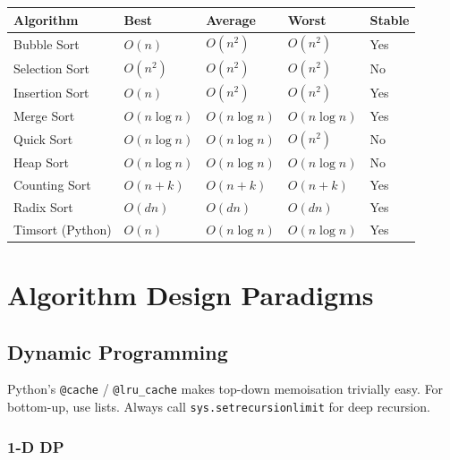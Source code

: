\documentclass[11pt,a4paper]{report}
\begin{document}
\begin{compbox}
\begin{tabular}{@{}lllll@{}}
\toprule
\textbf{Algorithm} & \textbf{Best} & \textbf{Average} & \textbf{Worst} & \textbf{Stable} \\
\midrule
Bubble Sort    & $O(n)$       & $O(n^2)$      & $O(n^2)$      & Yes \\
Selection Sort & $O(n^2)$     & $O(n^2)$      & $O(n^2)$      & No  \\
Insertion Sort & $O(n)$       & $O(n^2)$      & $O(n^2)$      & Yes \\
Merge Sort     & $O(n\log n)$ & $O(n\log n)$  & $O(n\log n)$  & Yes \\
Quick Sort     & $O(n\log n)$ & $O(n\log n)$  & $O(n^2)$      & No  \\
Heap Sort      & $O(n\log n)$ & $O(n\log n)$  & $O(n\log n)$  & No  \\
Counting Sort  & $O(n+k)$     & $O(n+k)$      & $O(n+k)$      & Yes \\
Radix Sort     & $O(dn)$      & $O(dn)$       & $O(dn)$       & Yes \\
Timsort (Python) & $O(n)$     & $O(n\log n)$  & $O(n\log n)$  & Yes \\
\bottomrule
\end{tabular}
\end{compbox}


\part{Algorithm Design Paradigms}

\chapter{Dynamic Programming}

\begin{notebox}[DP in Python vs C++]
Python's \texttt{@cache} / \texttt{@lru\_cache} makes top-down memoisation trivially easy. For bottom-up, use lists. Always call \texttt{sys.setrecursionlimit} for deep recursion.
\end{notebox}

\section{1-D DP}
\end{document}
